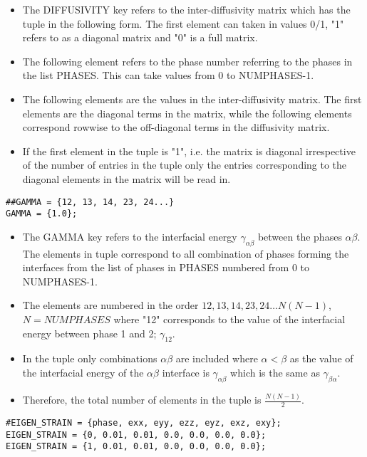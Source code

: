 \documentclass[a4paper,10pt]{article}
\begin{document}
\begin{itemize}
 \item The DIFFUSIVITY key refers to the inter-diffusivity matrix which has the tuple in the following form. The first element can taken in values 0/1, "1" refers to as a diagonal matrix and "0" is a full matrix.
 \item The following element refers to the phase number referring to the phases in the list PHASES. This can take values from 0 to NUMPHASES-1.
 \item The following elements are the values in the inter-diffusivity matrix. The first elements are the diagonal terms in the matrix, while the following 
 elements correspond rowwise to the off-diagonal terms in the diffusivity matrix.
 \item If the first element in the tuple is "1", i.e. the matrix is diagonal irrespective of the number of entries in the tuple only the entries 
 corresponding to the diagonal elements in the matrix will be read in.
\end{itemize}

\begin{lstlisting}
##GAMMA = {12, 13, 14, 23, 24...}
GAMMA = {1.0};
\end{lstlisting}

\begin{itemize}
 \item The GAMMA key refers to the interfacial energy $\gamma_{\alpha\beta}$ between the phases $\alpha\beta$. 
 The elements in tuple correspond to all combination of phases forming the interfaces from the list of phases in PHASES numbered from 0 to NUMPHASES-1.
 \item The elements are numbered in the order ${12,13,14,23,24 \ldots N(N-1)}$, $N=NUMPHASES$ where "12" corresponds to the value of the interfacial energy between phase 1 and 2; $\gamma_{12}$.
 \item In the tuple only combinations $\alpha\beta$ are included where $\alpha<\beta$ as the value of the interfacial energy of the $\alpha\beta$ interface is $\gamma_{\alpha\beta}$ which is the same as 
 $\gamma_{\beta\alpha}$.
 \item Therefore, the total number of elements in the tuple is $\frac{N(N-1)}{2}$.
\end{itemize}

\begin{lstlisting}
#EIGEN_STRAIN = {phase, exx, eyy, ezz, eyz, exz, exy};
EIGEN_STRAIN = {0, 0.01, 0.01, 0.0, 0.0, 0.0, 0.0};
EIGEN_STRAIN = {1, 0.01, 0.01, 0.0, 0.0, 0.0, 0.0};
\end{lstlisting}
\end{document}
